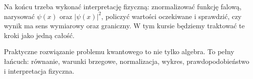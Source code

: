 Na końcu trzeba wykonać interpretację fizyczną: znormalizować funkcję falową, narysować \(\psi(x)\) oraz \(|\psi(x)|^2\), policzyć wartości oczekiwane i sprawdzić, czy wynik ma sens wymiarowy oraz graniczny. W tym kursie będziemy traktować te kroki jako jedną całość.

\begin{summarybox}
Praktyczne rozwiązanie problemu kwantowego to nie tylko algebra. To pełny łańcuch: równanie, warunki brzegowe, normalizacja, wykres, prawdopodobieństwo i interpretacja fizyczna.
\end{summarybox}
